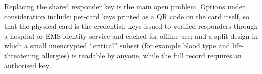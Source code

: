 Replacing the shared responder key is the main open problem. Options under
consideration include: per-card keys printed as a QR code on the card itself,
so that the physical card is the credential; keys issued to verified
responders through a hospital or EMS identity service and cached for offline
use; and a split design in which a small unencrypted ``critical'' subset (for
example blood type and life-threatening allergies) is readable by anyone,
while the full record requires an authorised key.


